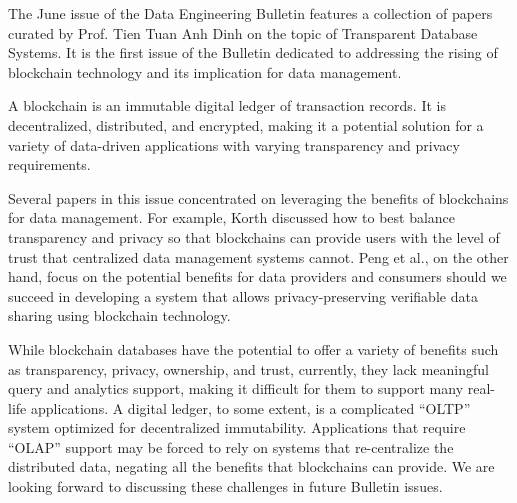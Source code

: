 \documentclass[11pt]{article}
\begin{document}
The June issue of the Data Engineering Bulletin features a collection
of papers curated by Prof. Tien Tuan Anh Dinh on the topic of
Transparent Database Systems. It is the first issue of the Bulletin
dedicated to addressing the rising of blockchain technology and its
implication for data management.

A blockchain is an immutable digital ledger of transaction records. It
is decentralized, distributed, and encrypted, making it a potential
solution for a variety of data-driven applications with varying
transparency and privacy requirements.

Several papers in this issue concentrated on leveraging the benefits
of blockchains for data management. For example, Korth discussed how
to best balance transparency and privacy so that blockchains can
provide users with the level of trust that centralized data management
systems cannot. Peng et al., on the other hand, focus on the potential
benefits for data providers and consumers should we succeed in
developing a system that allows privacy-preserving verifiable data
sharing using blockchain technology.

While blockchain databases have the potential to offer a variety of
benefits such as transparency, privacy, ownership, and trust,
currently, they lack meaningful query and analytics support, making it
difficult for them to support many real-life applications. A digital
ledger, to some extent, is a complicated ``OLTP'' system optimized for
decentralized immutability. Applications that require ``OLAP'' support
may be forced to rely on systems that re-centralize the distributed
data, negating all the benefits that blockchains can provide. We are
looking forward to discussing these challenges in future Bulletin
issues.
\end{document}
